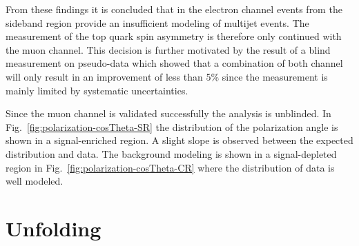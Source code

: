 
From these findings it is concluded that in the electron channel events from the sideband region provide an insufficient modeling of multijet events. The measurement of the top quark spin asymmetry is therefore only continued with the muon channel. This decision is further motivated by the result of a blind measurement on pseudo-data which showed that a combination of both channel will only result in an improvement of less than 5\% since the measurement is mainly limited by systematic uncertainties.

Since the muon channel is validated successfully the analysis is unblinded. In Fig.~\ref{fig:polarization-cosTheta-SR} the distribution of the polarization angle is shown in a signal-enriched region. A slight slope is observed between the expected distribution and data. The background modeling is shown in a signal-depleted region in Fig.~\ref{fig:polarization-cosTheta-CR} where the distribution of data is well modeled.


\section{Unfolding}
\label{sec:polarization-unfolding}

